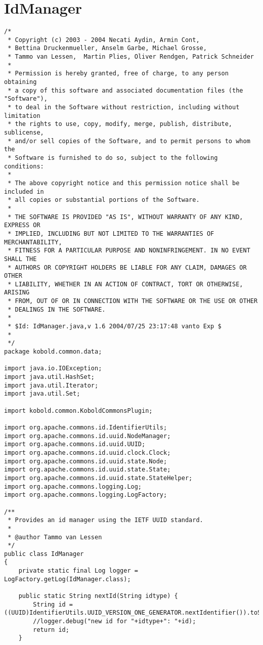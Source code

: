 \section{IdManager}
\small \begin{verbatim}
/*
 * Copyright (c) 2003 - 2004 Necati Aydin, Armin Cont, 
 * Bettina Druckenmueller, Anselm Garbe, Michael Grosse, 
 * Tammo van Lessen,  Martin Plies, Oliver Rendgen, Patrick Schneider
 * 
 * Permission is hereby granted, free of charge, to any person obtaining
 * a copy of this software and associated documentation files (the "Software"),
 * to deal in the Software without restriction, including without limitation
 * the rights to use, copy, modify, merge, publish, distribute, sublicense, 
 * and/or sell copies of the Software, and to permit persons to whom the 
 * Software is furnished to do so, subject to the following conditions:
 *
 * The above copyright notice and this permission notice shall be included in 
 * all copies or substantial portions of the Software.
 *
 * THE SOFTWARE IS PROVIDED "AS IS", WITHOUT WARRANTY OF ANY KIND, EXPRESS OR 
 * IMPLIED, INCLUDING BUT NOT LIMITED TO THE WARRANTIES OF MERCHANTABILITY, 
 * FITNESS FOR A PARTICULAR PURPOSE AND NONINFRINGEMENT. IN NO EVENT SHALL THE 
 * AUTHORS OR COPYRIGHT HOLDERS BE LIABLE FOR ANY CLAIM, DAMAGES OR OTHER 
 * LIABILITY, WHETHER IN AN ACTION OF CONTRACT, TORT OR OTHERWISE, ARISING 
 * FROM, OUT OF OR IN CONNECTION WITH THE SOFTWARE OR THE USE OR OTHER 
 * DEALINGS IN THE SOFTWARE.
 *
 * $Id: IdManager.java,v 1.6 2004/07/25 23:17:48 vanto Exp $
 *
 */
package kobold.common.data;

import java.io.IOException;
import java.util.HashSet;
import java.util.Iterator;
import java.util.Set;

import kobold.common.KoboldCommonsPlugin;

import org.apache.commons.id.IdentifierUtils;
import org.apache.commons.id.uuid.NodeManager;
import org.apache.commons.id.uuid.UUID;
import org.apache.commons.id.uuid.clock.Clock;
import org.apache.commons.id.uuid.state.Node;
import org.apache.commons.id.uuid.state.State;
import org.apache.commons.id.uuid.state.StateHelper;
import org.apache.commons.logging.Log;
import org.apache.commons.logging.LogFactory;

/**
 * Provides an id manager using the IETF UUID standard.
 * 
 * @author Tammo van Lessen
 */
public class IdManager 
{
    private static final Log logger = LogFactory.getLog(IdManager.class);
	
	public static String nextId(String idtype) {
		String id = ((UUID)IdentifierUtils.UUID_VERSION_ONE_GENERATOR.nextIdentifier()).toString();
		//logger.debug("new id for "+idtype+": "+id);
		return id;
	}
	

\end{verbatim}
